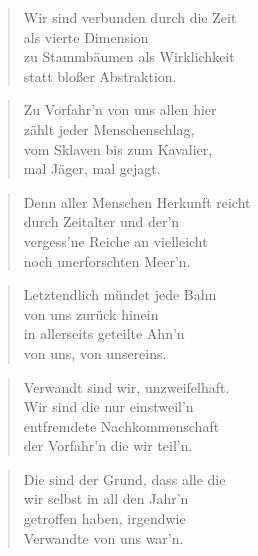 \documentclass[10pt,a4paper]{article}
\begin{document}
\begin{multicols}{2}
\begin{verse}
Wir sind verbunden durch die Zeit \\
als vierte Dimension \\
zu Stammbäumen als Wirklichkeit \\
statt bloßer Abstraktion. \\
\end{verse}

\begin{verse}
Zu Vorfahr’n von uns allen hier \\
zählt jeder Menschenschlag, \\
vom Sklaven bis zum Kavalier, \\
mal Jäger, mal gejagt. \\
\end{verse}

\begin{verse}
Denn aller Menschen Herkunft reicht \\
durch Zeitalter und der’n \\
vergess’ne Reiche an vielleicht \\
noch unerforschten Meer’n. \\
\end{verse}

\begin{verse}
Letztendlich mündet jede Bahn \\
von uns zurück hinein \\
in allerseits geteilte Ahn’n \\
von uns, von unsereins. \\
\end{verse}

\begin{verse}
Verwandt sind wir, unzweifelhaft. \\
Wir sind die nur einstweil’n \\
entfremdete Nachkommenschaft \\
der Vorfahr’n die wir teil’n. \\
\end{verse}

\begin{verse}
Die sind der Grund, dass alle die \\
wir selbst in all den Jahr’n \\
getroffen haben, irgendwie \\
Verwandte von uns war’n. \\
\end{verse}


\end{multicols}
\end{document}
